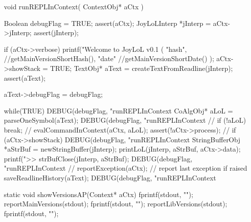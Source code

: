 \startCCode
void runREPLInContext(
  ContextObj* aCtx
) {
  Boolean debugFlag = TRUE;
  assert(aCtx);
  JoyLoLInterp *jInterp = aCtx->jInterp;
  assert(jInterp);
  
  if (aCtx->verbose) {
    printf("Welcome to JoyLoL v0.1 ( %
      "hash", //getMainVersionShortHash(),
      "date" //getMainVersionShortDate()
    );
  }
  aCtx->showStack = TRUE;
  TextObj* aText = createTextFromReadline(jInterp);
  assert(aText);

  aText->debugFlag = debugFlag;
  
  while(TRUE) {
    DEBUG(debugFlag, "runREPLInContext %
    CoAlgObj* aLoL = parseOneSymbol(aText);
    DEBUG(debugFlag, "runREPLInContext %
    //
    if (!aLoL) break;
    //
    evalCommandInContext(aCtx, aLoL);
    assert(!aCtx->process);
    //
    if (aCtx->showStack) {
      DEBUG(debugFlag, "runREPLInContext %
      StringBufferObj *aStrBuf = newStringBuffer(jInterp);
      printLoL(jInterp, aStrBuf, aCtx->data);
      printf(">>%
      strBufClose(jInterp, aStrBuf);
      DEBUG(debugFlag, "runREPLInContext %
    }
    //
    reportException(aCtx); // report last exception if raised
  }
  saveReadlineHistory(aText);
  DEBUG(debugFlag, "runREPLInContext %
}
\stopCCode

\starttyping
static void showVersionsAP(Context* aCtx) {
  fprintf(stdout, "\n");
  reportMainVersions(stdout);
  fprintf(stdout, "\n");
  reportLibVersions(stdout);
  fprintf(stdout, "\n");
}
\stoptyping